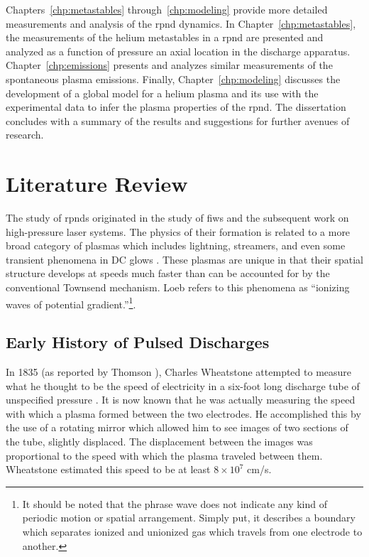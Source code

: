 Chapters~\ref{chp:metastables} through~\ref{chp:modeling} provide more detailed
measurements and analysis of the \acs{rpnd} dynamics. In
Chapter~\ref{chp:metastables}, the measurements of the helium metastables in a
\acs{rpnd} are presented and analyzed as a function of pressure an axial
location in the discharge apparatus. Chapter~\ref{chp:emissions} presents and
analyzes similar measurements of the spontaneous plasma emissions. Finally,
Chapter~\ref{chp:modeling} discusses the development of a global model for a
helium plasma and its use with the experimental data to infer the plasma
properties of the \acs{rpnd}. The dissertation concludes with a summary of the
results and suggestions for further avenues of research.

\section{Literature Review}

The study of \acs{rpnd}s originated in the study of \acs{fiw}s and the
subsequent work on high-pressure laser systems. The physics of their formation
is related to a more broad category of plasmas which includes lightning,
streamers, and even some transient phenomena in DC glows \cite{Loeb1965}. These
plasmas are unique in that their spatial structure develops at speeds much
faster than can be accounted for by the conventional Townsend mechanism. Loeb
refers to this phenomena as ``ionizing waves of potential
gradient.''\footnote{It should be noted that the phrase wave does not indicate
any kind of periodic motion or spatial arrangement. Simply put, it describes a
boundary which separates ionized and unionized gas which travels from one
electrode to another.}.

\subsection{Early History of Pulsed Discharges}

In 1835 (as reported by Thomson \cite{Thomson1893}), Charles Wheatstone
attempted to measure what he thought to be the speed of electricity in a
six-foot long discharge tube of unspecified pressure \cite{Wheatstone1835}. It
is now known that he was actually measuring the speed with which a plasma formed
between the two electrodes. He accomplished this by the use of a rotating mirror
which allowed him to see images of two sections of the tube, slightly displaced.
The displacement between the images was proportional to the speed with which the
plasma traveled between them. Wheatstone estimated this speed to be at least
$8\times10^7$ cm/s.

